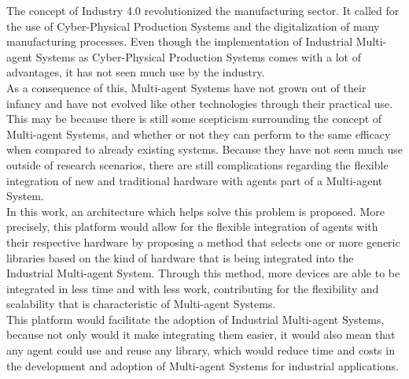 
%

The concept of Industry 4.0 revolutionized the manufacturing sector. It called for the use of Cyber-Physical Production Systems and the digitalization of many manufacturing processes. Even though the implementation of Industrial Multi-agent Systems as Cyber-Physical Production Systems comes with a lot of advantages, it has not seen much use by the industry.\\

As a consequence of this, Multi-agent Systems have not grown out of their infancy and have not evolved like other technologies through their practical use. This may be because there is still some scepticism surrounding the concept of Multi-agent Systems, and whether or not they can perform to the same efficacy when compared to already existing systems. Because they have not seen much use outside of research scenarios, there are still complications regarding the flexible integration of new and traditional hardware with agents part of a Multi-agent System.\\

In this work, an architecture which helps solve this problem is proposed. More precisely, this platform would allow for the flexible integration of agents with their respective hardware by proposing a method that selects one or more generic libraries based on the kind of hardware that is being integrated into the Industrial Multi-agent System. Through this method, more devices are able to be integrated in less time and with less work, contributing for the flexibility and scalability that is characteristic of Multi-agent Systems.\\

This platform would facilitate the adoption of Industrial Multi-agent Systems, because not only would it make integrating them easier, it would also mean that any agent could use and reuse any library, which would reduce time and costs in the development and adoption of Multi-agent Systems for industrial applications.\\

%
%

